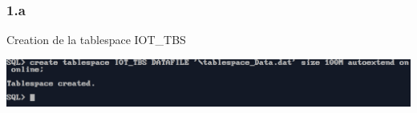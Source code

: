 \subsubsection*{1.a}
Creation de la tablespace IOT\_TBS



\begin{center}
    \includegraphics[width=\textwidth]{ScreenShot/Partie1/ts1.png}
\end{center}


